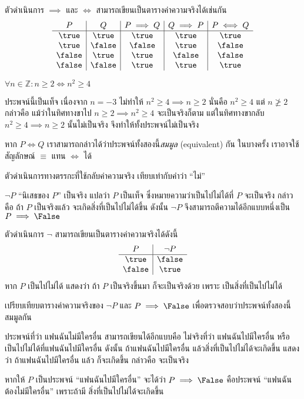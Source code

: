 ตัวดำเนินการ $\implies$ และ $\iff$ สามารถเขียนเป็นตารางค่าความจริงได้เช่นกัน
\[
\begin{array}{c|c|c|c|c}
P & Q & P\implies Q & Q\implies P & P\iff Q \\\hline
\true & \true & \true & \true & \true \\
\true & \false & \false & \true & \false \\
\false & \true & \true & \false & \false \\
\false & \false & \true & \true & \true
\end{array}
\]
\begin{example}
$\forall n\in\mathbb{Z}: n\geq 2\iff n^2\geq 4$

ประพจน์นี้เป็นเท็จ เนื่องจาก $n=-3$ ไม่ทำให้ $n^2\geq 4\implies n\geq 2$ นั่นคือ $n^2\geq 4$ แต่ $n\not\geq 2$ \enskip กล่าวคือ แม้ว่าในทิศทางขาไป $n\geq 2\implies n^2\geq 4$ จะเป็นจริงก็ตาม แต่ในทิศทางขากลับ $n^2\geq 4\implies n\geq 2$ นั้นไม่เป็นจริง จึงทำให้ทั้งประพจน์ไม่เป็นจริง
\end{example}

หาก $P\iff Q$ เราสามารถกล่าวได้ว่าประพจน์ทั้งสองนี้\emph{สมมูล} (equivalent) กัน \enskip ในบางครั้ง เราอาจใช้สัญลักษณ์ $\equiv$ แทน $\iff$ ได้

ตัวดำเนินการทางตรรกะที่ใช้กลับค่าความจริง เทียบเท่ากับคำว่า ``ไม่''
\begin{definition}[negation]
    $\neg P$ ``นิเสธของ $P$'' เป็นจริง แปลว่า $P$ เป็นเท็จ ซึ่งหมายความว่าเป็นไปไม่ได้ที่ $P$ จะเป็นจริง กล่าวคือ ถ้า $P$ เป็นจริงแล้ว จะเกิดสิ่งที่เป็นไปไม่ได้ขึ้น \enskip ดังนั้น $\neg P$ จึงสามารถตีความได้อีกแบบหนึ่งเป็น $P\implies\False$
\end{definition}
ตัวดำเนินการ $\neg$ สามารถเขียนเป็นตารางค่าความจริงได้ดังนี้
\[
\begin{array}{c|c}
P & \neg P \\\hline
\true & \false \\
\false & \true \\
\end{array}
\]
หาก $P$ เป็นไปไม่ได้ แสดงว่า ถ้า $P$ เป็นจริงขึ้นมา \False{} ก็จะเป็นจริงด้วย เพราะ \False{} เป็นสิ่งที่เป็นไปไม่ได้
\begin{exercise}
    เปรียบเทียบตารางค่าความจริงของ $\neg P$ และ $P\implies\False$ เพื่อตรวจสอบว่าประพจน์ทั้งสองนี้สมมูลกัน
\end{exercise}

\begin{example}\label{ex:neg-couple}
ประพจน์ที่ว่า แฟนฉันไม่มีใครอื่น สามารถเขียนได้อีกแบบคือ ไม่จริงที่ว่า แฟนฉันไปมีใครอื่น หรือ เป็นไปไม่ได้ที่แฟนฉันไปมีใครอื่น \enskip ดังนั้น ถ้าแฟนฉันไปมีใครอื่น แล้วสิ่งที่เป็นไปไม่ได้จะเกิดขึ้น \enskip แสดงว่า ถ้าแฟนฉันไปมีใครอื่น แล้ว \False{} ก็จะเกิดขึ้น กล่าวคือ \False{} จะเป็นจริง

หากให้ $P$ เป็นประพจน์ ``แฟนฉันไปมีใครอื่น'' จะได้ว่า $P\implies\False$ คือประพจน์ ``แฟนฉันต้องไม่มีใครอื่น'' เพราะถ้ามี สิ่งที่เป็นไปไม่ได้จะเกิดขึ้น
\end{example}

